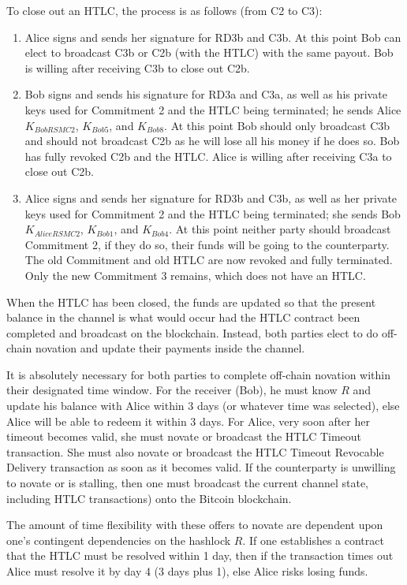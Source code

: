 \documentclass[letterpaper,11pt]{article}
\begin{document}
To close out an HTLC, the process is as follows (from C2 to C3):

\begin{enumerate}
	\item Alice signs and sends her signature for RD3b and C3b. At this
		point Bob can elect to broadcast C3b or C2b (with the HTLC) with
		the same payout. Bob is willing after receiving C3b to close out
		C2b.
	\item Bob signs and sends his signature for RD3a and C3a, as well as his
		private keys used for Commitment 2 and the HTLC being
		terminated; he sends Alice $K_{BobRSMC2}$, $K_{Bob5}$, and
		$K_{Bob8}$. At this point Bob should only broadcast C3b and
		should not broadcast C2b as he will lose all his money if he
		does so. Bob has fully revoked C2b and the HTLC. Alice is
		willing after receiving C3a to close out C2b.
	\item Alice signs and sends her signature for RD3b and C3b, as well as
		her private keys used for Commitment 2 and the HTLC being
		terminated; she sends Bob $K_{AliceRSMC2}$, $K_{Bob1}$, and
		$K_{Bob4}$. At this point neither party should broadcast
		Commitment 2, if they do so, their funds will be going to the
		counterparty. The old Commitment and old HTLC are now revoked
		and fully terminated. Only the new Commitment 3 remains, which
		does not have an HTLC.
\end{enumerate}

When the HTLC has been closed, the funds are updated so that the present balance
in the channel is what would occur had the HTLC contract been completed and
broadcast on the blockchain. Instead, both parties elect to do off-chain
novation and update their payments inside the channel.

It is absolutely necessary for both parties to complete off-chain novation
within their designated time window. For the receiver (Bob), he must know $R$
and update his balance with Alice within 3 days (or whatever time was selected),
else Alice will be able to redeem it within 3 days. For Alice, very soon after
her timeout becomes valid, she must novate or broadcast the HTLC Timeout
transaction. She must also novate or broadcast the HTLC Timeout Revocable
Delivery transaction as soon as it becomes valid. If the counterparty is
unwilling to novate or is stalling, then one must broadcast the current channel
state, including HTLC transactions) onto the Bitcoin blockchain.

The amount of time flexibility with these offers to novate are dependent upon
one's contingent dependencies on the hashlock $R$. If one establishes a contract
that the HTLC must be resolved within 1 day, then if the transaction times out
Alice must resolve it by day 4 (3 days plus 1), else Alice risks losing funds.
\end{document}
